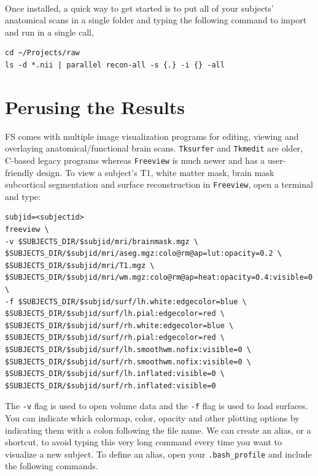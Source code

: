 \documentclass[paper=a4, fontsize=11pt]{scrartcl} %
\numberwithin{equation}{section} %
\numberwithin{figure}{section} %
\numberwithin{table}{section} %
\begin{document}
~\\Once installed, a quick way to get started is to put all of your subjects' anatomical scans in a single folder and typing the following command to import and run in a single call,
\begin{lstlisting}
cd ~/Projects/raw
ls -d *.nii | parallel recon-all -s {.} -i {} -all
\end{lstlisting}
\section{Perusing the Results}  FS comes with multiple image visualization programs for editing, viewing and overlaying anatomical/functional brain scans.  \texttt{Tksurfer} and \texttt{Tkmedit} are older, C-based legacy programs whereas \texttt{Freeview} is much newer and has a user-friendly design. To view a subject's T1, white matter mask, brain mask subcortical segmentation and surface reconstruction in \texttt{Freeview}, open a terminal and type:
\begin{lstlisting}[frame=single]
subjid=<subjectid>
freeview \
-v $SUBJECTS_DIR/$subjid/mri/brainmask.mgz \                                                                               
$SUBJECTS_DIR/$subjid/mri/aseg.mgz:colo@rm@ap=lut:opacity=0.2 \                                                                                        
$SUBJECTS_DIR/$subjid/mri/T1.mgz \                                                                                                                  
$SUBJECTS_DIR/$subjid/mri/wm.mgz:colo@rm@ap=heat:opacity=0.4:visible=0 \                                                                              
-f $SUBJECTS_DIR/$subjid/surf/lh.white:edgecolor=blue \                                                                                             
$SUBJECTS_DIR/$subjid/surf/lh.pial:edgecolor=red \                                                                                                  
$SUBJECTS_DIR/$subjid/surf/rh.white:edgecolor=blue \                                                                                                
$SUBJECTS_DIR/$subjid/surf/rh.pial:edgecolor=red \                                                                                                  
$SUBJECTS_DIR/$subjid/surf/lh.smoothwm.nofix:visible=0 \                                                                                            
$SUBJECTS_DIR/$subjid/surf/rh.smoothwm.nofix:visible=0 \                                                                                            
$SUBJECTS_DIR/$subjid/surf/lh.inflated:visible=0 \                                                                                                  
$SUBJECTS_DIR/$subjid/surf/rh.inflated:visible=0
\end{lstlisting}
The \texttt{-v} flag is used to open volume data and the \texttt{-f} flag is used to load surfaces.  You can indicate which colormap, color, opacity and other plotting options by indicating them with a colon following the file name.  We can create an alias, or a shortcut, to avoid typing this very long command every time you want to visualize a new subject.   To define an alias, open your \texttt{.bash\_profile} and include the following commands.
\end{document}
